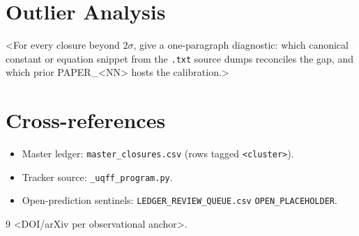 \documentclass[11pt]{article}
\begin{document}
\section{Outlier Analysis}
<For every closure beyond $2\sigma$, give a one-paragraph diagnostic:
which canonical constant or equation snippet from the \texttt{.txt}
source dumps reconciles the gap, and which prior PAPER\_<NN> hosts
the calibration.>

\section{Cross-references}
\begin{itemize}
  \item Master ledger: \texttt{master\_closures.csv} (rows tagged \texttt{<cluster>}).
  \item Tracker source: \texttt{\_uqff\_program.py}.
  \item Open-prediction sentinels: \texttt{LEDGER\_REVIEW\_QUEUE.csv} \texttt{OPEN\_PLACEHOLDER}.
\end{itemize}


\begin{thebibliography}{9}
 <DOI/arXiv per observational anchor>.
\end{thebibliography}
\end{document}
